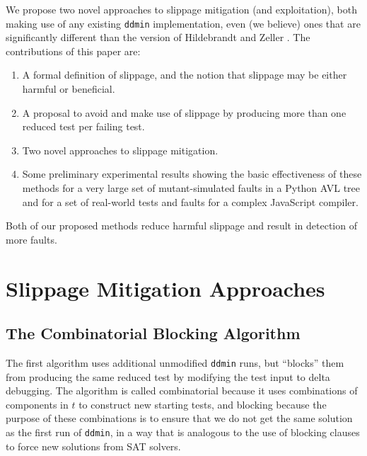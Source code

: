 We
propose two novel approaches to slippage mitigation (and
exploitation), both making use of any existing {\tt ddmin}
implementation, even (we believe) ones that are significantly different than the
version of Hildebrandt and Zeller \cite{DD}.  The contributions of this paper are:

\begin{enumerate}
\item A formal definition of slippage, and the notion that slippage
  may be either harmful or beneficial.
\item A proposal to avoid and make use of slippage by producing more
  than one reduced test per failing test.
\item Two novel approaches to slippage mitigation.
\item Some preliminary experimental results showing the basic effectiveness of these
  methods for a very large set of mutant-simulated faults in a Python
  AVL tree and for a set of real-world tests and faults for a complex
  JavaScript compiler.
\end{enumerate}

Both of our proposed methods reduce harmful slippage and result in
detection of more faults.

\section{Slippage Mitigation Approaches}

\subsection{The Combinatorial Blocking Algorithm}

The first algorithm uses additional unmodified {\tt ddmin} runs, but
``blocks'' them from producing the same reduced test by modifying the
test input to delta debugging.  The algorithm is called combinatorial
because it uses combinations of components in $t$ to construct new
starting tests, and blocking because the purpose of these combinations
is to ensure that we do not get the same solution as the first run of
{\tt ddmin}, in a way that is analogous to the use of blocking clauses
to force new solutions from SAT solvers.

